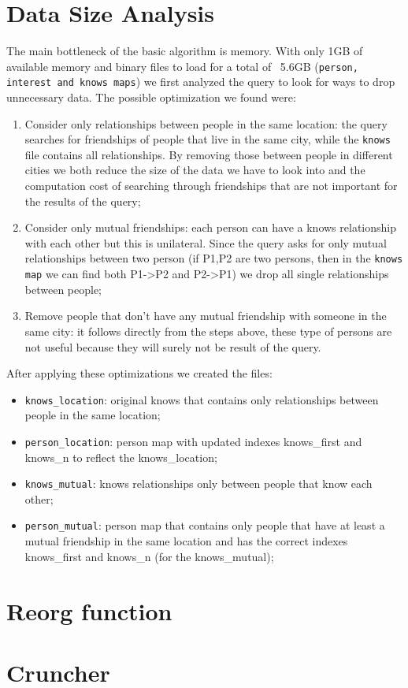\section{Data Size Analysis}
The main bottleneck of the basic algorithm is memory. With only 1GB of available memory and binary files to load for a total of ~5.6GB (\texttt{person, interest and knows maps}) we first analyzed the query to look for ways to drop unnecessary data. The possible optimization we found were:
\begin{enumerate}
    \item Consider only relationships between people in the same location: the query searches for friendships of people that live in the same city, while the \texttt{knows} file contains all relationships. By removing those between people in different cities we both reduce the size of the data we have to look into and the computation cost of searching through friendships that are not important for the results of the query;
    \item Consider only mutual friendships: each person can have a knows relationship with each other but this is unilateral. Since the query asks for only mutual relationships between two person (if P1,P2 are two persons, then in the \texttt{knows map} we can find both P1->P2 and P2->P1) we drop all single relationships between people;
    \item Remove people that don't have any mutual friendship with someone in the same city: it follows directly from the steps above, these type of persons are not useful because they will surely not be result of the query.
\end{enumerate}
After applying these optimizations we created the files:
\begin{itemize}
    \item \texttt{knows_location}: original knows that contains only relationships between people in the same location;
    \item \texttt{person_location}: person map with updated indexes knows_first and knows_n to reflect the knows_location;
    \item \texttt{knows_mutual}: knows relationships only between people that know each other;
    \item \texttt{person_mutual}: person map that contains only people that have at least a mutual friendship in the same location and has the correct indexes knows_first and knows_n (for the knows_mutual);
\end{itemize}
 \texttt{}
\section{Reorg function}

\section{Cruncher}






\clearpage



